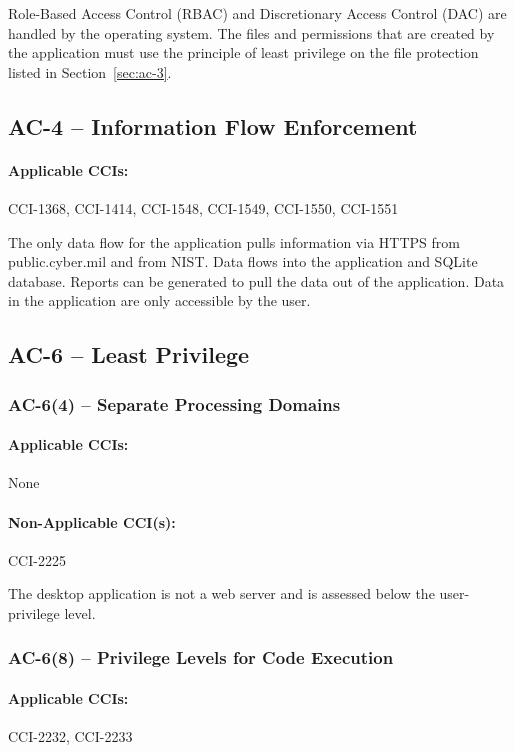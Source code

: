\documentclass[letterpaper, 10pt, twoside]{article}
\begin{document}
Role-Based Access Control (RBAC) and Discretionary Access Control (DAC) are handled by the operating system. The files and permissions that are created by the application must use the principle of least privilege on the file protection listed in Section~\ref{sec:ac-3}.

\subsection{AC-4 -- Information Flow Enforcement}

\paragraph{Applicable CCIs:} CCI-1368, CCI-1414, CCI-1548, CCI-1549, CCI-1550, CCI-1551

The only data flow for the application pulls information via HTTPS from public.cyber.mil and from NIST. Data flows into the application and SQLite database. Reports can be generated to pull the data out of the application. Data in the application are only accessible by the user.

\subsection{AC-6 -- Least Privilege}
\label{sec:ac-6}

\subsubsection{AC-6(4) -- Separate Processing Domains}

\paragraph{Applicable CCIs:} None

\paragraph{Non-Applicable CCI(s):} CCI-2225

The desktop application is not a web server and is assessed below the user-privilege level.

\subsubsection{AC-6(8) -- Privilege Levels for Code Execution}

\paragraph{Applicable CCIs:} CCI-2232, CCI-2233
\end{document}
